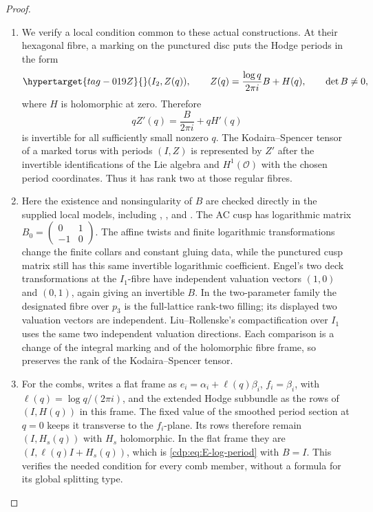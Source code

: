\begin{proof}

\begin{enumerate}[label={$\langle1\rangle$\arabic*.},leftmargin=*]
\item We verify a local condition common to these actual constructions.
At their hexagonal fibre, a marking on the punctured disc puts
the Hodge periods in the form
\begin{equation}\hypertarget{tag-019Z}{}\label{cdp:eq:E-log-period}
  (I_2,Z(q)),\qquad
 Z(q)=\frac{\log q}{2\pi i}B+H(q),
 \qquad \det B\ne0,
\end{equation}
where $H$ is holomorphic at zero. Therefore
\[
 qZ'(q)=\frac{B}{2\pi i}+qH'(q)
\]
is invertible for all sufficiently small nonzero $q$. The
Kodaira--Spencer tensor of a marked torus with periods $(I,Z)$
is represented by $Z'$ after the invertible identifications of
the Lie algebra and $H^1(\mathcal O)$ with the chosen period
coordinates. Thus it has rank two at those regular fibres.

\item Here the existence and nonsingularity of $B$ are checked directly
in the supplied local models, including
\cite[Proposition labelled \texttt{hexfill}]{Viaclovsky2026Combs},
\cite[Proposition labelled \texttt{mum}]{Viaclovsky2026Two}, and
\cite[Proposition labelled \texttt{prop: compactification X}]{LiuRollenske2026}.
The AC cusp has logarithmic matrix
$B_0=\left(\begin{smallmatrix}0&1\\-1&0\end{smallmatrix}\right)$.
The affine twists and finite logarithmic transformations change
the finite collars and constant gluing data, while the punctured
cusp matrix still has this same invertible logarithmic coefficient.
Engel's two deck transformations at the $I_1$-fibre have independent
valuation vectors $(1,0)$ and $(0,1)$, again giving an invertible
$B$. In the two-parameter family the designated fibre over $p_3$
is the full-lattice rank-two filling; its displayed two valuation
vectors are independent. Liu--Rollenske's compactification over
$I_1$ uses the same two independent valuation directions. Each
comparison is a change of the integral marking and of the
holomorphic fibre frame, so preserves the rank of the
Kodaira--Spencer tensor.

\item For the combs, \cite[Proposition labelled \texttt{periodextension},
case (i)]{Viaclovsky2026Combs} writes a flat frame as
$e_i=\alpha_i+\ell(q)\beta_i$, $f_i=\beta_i$, with
$\ell(q)=\log q/(2\pi i)$, and the extended Hodge subbundle as
the rows of $(I,H(q))$ in this frame. The fixed value of the
smoothed period section at $q=0$ keeps it transverse to the
$f_i$-plane. Its rows therefore remain $(I,H_s(q))$ with
$H_s$ holomorphic. In the flat frame they are
$(I,\ell(q)I+H_s(q))$, which is \eqref{cdp:eq:E-log-period} with
$B=I$. This verifies the needed condition for every comb member,
without a formula for its global splitting type.


\end{enumerate}
\end{proof}
